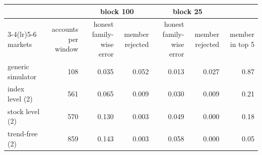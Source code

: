 \begin{tabular}{lrrrrrr}
\toprule
& & \multicolumn{2}{c}{block 100} & \multicolumn{2}{c}{block 25} & \\
\cmidrule(lr){3-4}\cmidrule(lr){5-6}
markets & accounts per window & honest family-wise error & member rejected & honest family-wise error & member rejected & member in top 5 \\
\midrule
generic simulator & 108 & 0.035 & 0.052 & 0.013 & 0.027 & 0.87 \\
index level (2) & 561 & 0.065 & 0.009 & 0.030 & 0.009 & 0.21 \\
stock level (2) & 570 & 0.130 & 0.003 & 0.049 & 0.000 & 0.18 \\
trend-free (2) & 859 & 0.143 & 0.003 & 0.058 & 0.000 & 0.05 \\
\bottomrule
\end{tabular}
